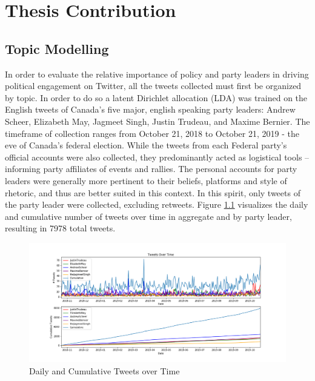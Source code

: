 \chapter{Thesis Contribution}\label{ch:ThesisCont}
      
\section{Topic Modelling}\label{sec:TopicModelling}

In order to evaluate the relative importance of policy and party leaders in
driving political engagement on Twitter, all the tweets collected must first be
organized by topic. In order to do so a latent Dirichlet allocation (LDA) was
trained on the English tweets of Canada's five major, english speaking party
leaders: Andrew Scheer, Elizabeth May, Jagmeet Singh, Justin Trudeau, and Maxime
Bernier. The timeframe of collection ranges from October 21, 2018 to October 21,
2019 - the eve of Canada's federal election. While the tweets from each Federal
party's official accounts were also collected, they predominantly acted as
logistical tools -- informing party affiliates of events and rallies. The
personal accounts for party leaders were generally more pertinent to their
beliefs, platforms and style of rhetoric, and thus are better suited in this
context. In this spirit, only tweets of the party leader were collected,
excluding retweets. Figure \ref{fig:tweets_over_time} visualizes the daily and
cumulative number of tweets over time in aggregate and by party leader,
resulting in 7978 total tweets.

\begin{singlespacing}
    \begin{figure}[H]
    \centering
    \includegraphics[scale=0.40]{Figures/tweets_over_time}
    \caption[Daily and Cumulative Tweets over Time]{Daily and Cumulative Tweets over Time}
    \label{fig:tweets_over_time}
    \end{figure}
\end{singlespacing}

